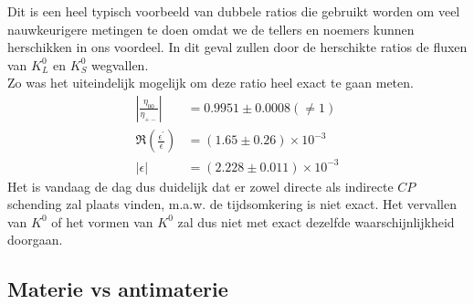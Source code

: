\documentclass[../main.tex]{subfiles}
\begin{document}
Dit is een heel typisch voorbeeld van dubbele ratios die gebruikt worden om veel nauwkeurigere metingen te doen omdat we de tellers en noemers kunnen herschikken in ons voordeel. In dit geval zullen door de herschikte ratios de fluxen van $K_L^0$ en $K_S^0$ wegvallen.\\
Zo was het uiteindelijk mogelijk om deze ratio heel exact te gaan meten.
\begin{equation}
    \begin{aligned}
        \label{eq:eta_ratio_results}
        \left|\frac{\eta_{00}}{\eta_{+-}}\right| &=0.9951 \pm 0.0008(\neq 1) \\
        \Re\left(\frac{\epsilon^{\prime}}{\epsilon}\right) &=(1.65 \pm 0.26) \times 10^{-3} \\
        |\epsilon| &=(2.228 \pm 0.011) \times 10^{-3}
    \end{aligned}
\end{equation}
Het is vandaag de dag dus duidelijk dat er zowel directe als indirecte $CP$ schending zal plaats vinden, m.a.w. de tijdsomkering is niet exact. Het vervallen van $K^0$ of het vormen van $K^0$ zal dus niet met exact dezelfde waarschijnlijkheid doorgaan.

\subsection{Materie vs antimaterie}%
\label{sub:materie_vs_antimaterie}
\end{document}
